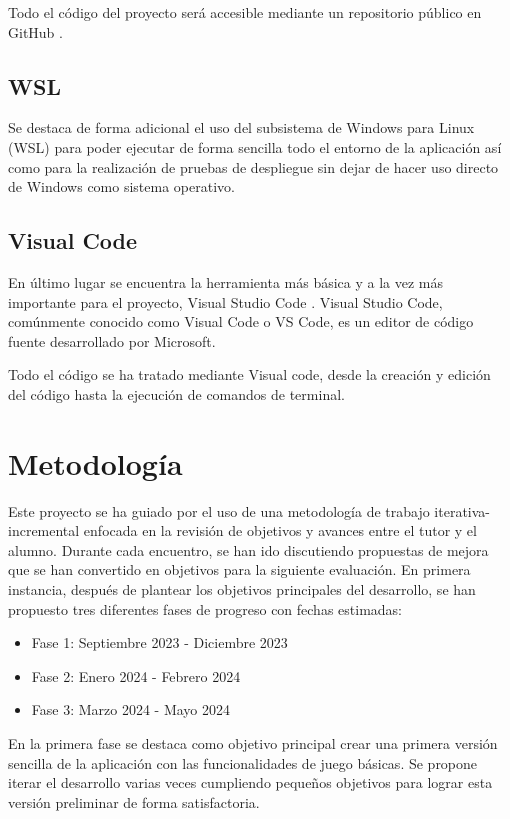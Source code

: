 Todo el código del proyecto será accesible mediante un repositorio público en GitHub \cite{repositorio} .

\subsection{WSL}

Se destaca de forma adicional el uso del subsistema de Windows para Linux (WSL) \cite{wsl} para poder ejecutar de forma sencilla
todo el entorno de la aplicación así como para la realización de pruebas de despliegue sin dejar de hacer uso directo de Windows
como sistema operativo.

\subsection{Visual Code}

En último lugar se encuentra la herramienta más básica y a la vez más importante para
el proyecto, Visual Studio Code \cite{vscode}. Visual Studio Code, comúnmente conocido como Visual Code o VS Code,
es un editor de código fuente desarrollado por Microsoft.

Todo el código se ha tratado mediante Visual code, desde la creación y edición del código hasta la ejecución de comandos
de terminal.


\section{Metodología}

Este proyecto se ha guiado por el uso de una metodología de trabajo iterativa-incremental enfocada en la revisión de objetivos y
avances entre el tutor y el alumno. Durante cada encuentro, se han ido discutiendo propuestas de mejora que se han convertido en
objetivos para la siguiente evaluación. En primera instancia, después de 
plantear los objetivos principales del desarrollo, se han propuesto tres diferentes fases de progreso con fechas estimadas:

\begin{itemize}
	\item Fase 1: Septiembre 2023 - Diciembre 2023
	\item Fase 2: Enero 2024 - Febrero 2024
	\item Fase 3: Marzo 2024 - Mayo 2024
\end{itemize}

En la primera fase se destaca como objetivo principal crear una primera versión sencilla de la aplicación con 
las funcionalidades de juego básicas. Se propone iterar el desarrollo 
varias veces cumpliendo pequeños objetivos para lograr esta versión preliminar de forma satisfactoria.

